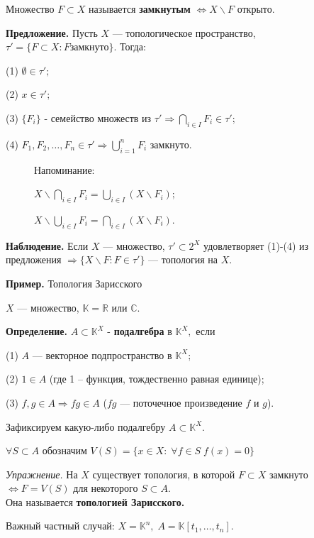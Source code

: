 \documentclass[12pt,a4paper]{article}
\begin{document}
Множество $F \subset X$ называется \textbf{замкнутым} $\Leftrightarrow X \backslash F$ открыто.

\textbf{Предложение.} Пусть $X$ --- топологическое пространство, $\tau' = \{ F \subset X: F \text{замкнуто}\}$. Тогда:

(1) $\emptyset \in \tau';$

(2) $x \in \tau';$

(3) $\{F_i\}$ - семейство множеств из $\tau' \Rightarrow \bigcap_{i \in I} F_i \in \tau';$

(4) $F_1, F_2, \ldots, F_n \in \tau' \Rightarrow \bigcup^n_{i = 1} F_i$ замкнуто.

\begin{figure}
	Напоминание:
	
	$X \backslash \bigcap_{i \in I} F_i = \bigcup_{i \in I}\left( X \backslash F_i \right);$
	
	$X \backslash \bigcup_{i \in I} F_i = \bigcap_{i \in I}\left( X \backslash F_i \right).$
\end{figure}


\textbf{Наблюдение.} Если $X$ --- множество, $\tau' \subset 2^X$ удовлетворяет (1)-(4) из предложения $\Rightarrow \{X \backslash F \colon F \in \tau'\}$ --- топология на $X.$

\textbf{Пример.} Топология Зарисского

$X$ --- множество, $\mathbb{K} = \mathbb{R}$ или $\mathbb{C}$.

\textbf{Определение.} $A \subset \mathbb{K}^X$ - \textbf{подалгебра} в $\mathbb{K}^X,$ если

(1) $A$ --- векторное подпространство в $\mathbb{K}^X;$

(2) $1 \in A$ (где 1 -- функция, тождественно равная единице);

(3) $f, g \in A \Rightarrow fg \in A$ ($fg$ --- поточечное произведение $f$ и $g$).

Зафиксируем какую-либо подалгебру $A \subset \mathbb{K}^X.$

$\forall S \subset A$ обозначим $V(S) = \{ x \in X: \; \forall f \in S \; f(x) = 0 \}$ 

\textit{Упражнение.} На $X$ существует топология, в которой $F \subset X$ замкнуто $\Leftrightarrow F = V(S)$ для некоторого $S \subset A$. \\Она называется \textbf{топологией Зарисского.}

Важный частный случай: $X = \mathbb{K}^n, \; A = \mathbb{K}[t_1, \ldots, t_n].$
\end{document}
